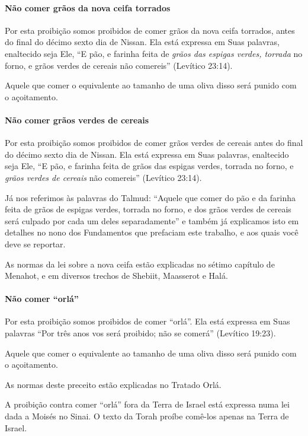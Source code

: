 \paragraph{Não comer grãos da nova ceifa torrados}

Por esta proibição somos proibidos de comer grãos da nova ceifa
torrados, antes do final do décimo sexto dia de Nissan. Ela está
expressa em Suas palavras, enaltecido seja Ele, ``E pão, e farinha feita
de \emph{grãos das espigas verdes, torrada} no forno, e grãos verdes de
cereais não comereis'' (Levítico 23:14).

Aquele que comer o equivalente ao tamanho de uma oliva disso será punido
com o açoitamento.

\paragraph{Não comer grãos verdes de cereais}

Por esta proibição somos proibidos de comer grãos verdes de cereais
antes do final do décimo sexto dia de Nissan. Ela está expressa em Suas
palavras, enaltecido seja Ele, ``E pão, e farinha feita de grãos das
espigas verdes, torrada no forno, e \emph{grãos verdes de cereais} não
comereis'' (Levítico 23:14).

Já nos referimos às palavras do Talmud: ``Aquele que comer do pão e da
farinha feita de grãos de espigas verdes, torrada no forno, e dos grãos
verdes de cereais será culpado por cada um deles separadamente'' e
também já explicamos isto em detalhes no nono dos Fundamentos que
prefaciam este trabalho, e aos quais você deve se reportar.

As normas da lei sobre a nova ceifa estão explicadas no sétimo capítulo
de Menahot, e em diversos trechos de Shebiit, Maasserot e Halá.

\paragraph{Não comer ``orlá''}

Por esta proibição somos proibidos de comer ``orlá''. Ela está expressa
em Suas palavras ``Por três anos vos será proibido; não se comerá''
(Levítico 19:23).

Aquele que comer o equivalente ao tamanho de uma oliva disso será punido
com o açoitamento.

As normas deste preceito estão explicadas no Tratado Orlá.

A proibição contra comer ``orlá'' fora da Terra de Israel está expressa
numa lei dada a Moisés no Sinai. O texto da Torah proíbe comê-los apenas
na Terra de Israel.

